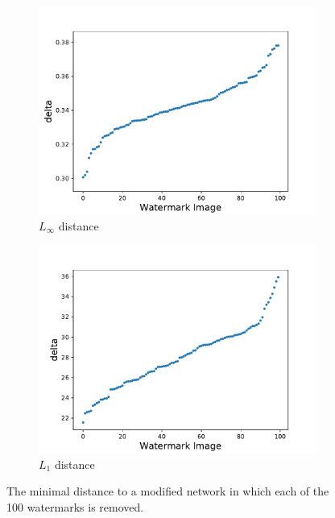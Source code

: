 \documentclass{easychair}
\begin{document}
\begin{figure}[htp]
  \centering
  \begin{subfigure}{0.4\linewidth}
    \includegraphics[width=\linewidth]{../data/results/problem3/mnist_w_wm_sorted.pdf}
     \caption{$L_\infty$ distance}
  	\label{fig:minSingleLP}
  \end{subfigure}
  \begin{subfigure}{0.4\linewidth}
    \includegraphics[width=\linewidth]{../data/results/problem2/mnist_w_wm_sorted.pdf}
    \caption{$L_1$ distance}
  	\label{fig:minSingleNotLP}
  \end{subfigure}
  \caption{The minimal distance to a modified network in
       which each of the 100 watermarks is removed.}
\label{fig:minSingle}
\end{figure}
\end{document}
